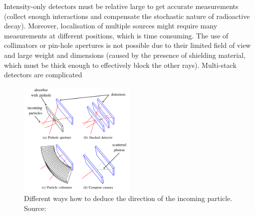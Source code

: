 {  %
  Intensity-only detectors must be relative large to get accurate measurements (collect enough interactions and compensate the stochastic nature of radioactive decay).  
  Moreover, localisation of multiple sources might require many measurements at different positions, which is time consuming.
  The use of collimators or pin-hole apertures is not possible due to their limited field of view and large weight and dimensions (caused by the presence of shielding material, which must be thick enough to effectively block the other rays).
  Multi-stack detectors are complicated 
  \begin{figure}[!h]
      \centering
      \includegraphics[width=0.5\textwidth]{./fig/photos/detector_overview_baca2019.png}
      \caption{Different ways how to deduce the direction of the incoming particle. Source: \cite{baca2019timepix}}
      \label{fig:sensor_overview}
  \end{figure}
}%

